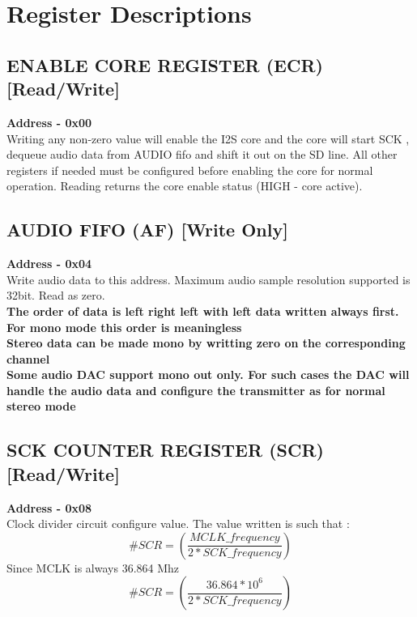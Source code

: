 \documentclass[12pt,a4paper]{report}
\begin{document}
\section{Register Descriptions}

\subsection{ENABLE CORE REGISTER (ECR)  [Read/Write] }
\hspace{1.6cm}
\textbf{Address - 0x00}
\\
\hspace{1.6cm}
Writing any non-zero value will enable the I2S core and the core will start SCK , dequeue audio data from AUDIO fifo and shift it out on the SD line.
All other registers if needed  must be configured before enabling the core for normal operation. Reading returns the core enable status (HIGH - core active).

\subsection{AUDIO FIFO (AF) [Write Only] }
\hspace{1.6cm}
\textbf{Address - 0x04}
\\
\hspace{1.6cm}
Write audio data to this address. Maximum audio sample resolution supported is 32bit. Read as zero.
\\
\textbf{The order of data is left right left with left data written always first. }
\\
\textbf{For mono mode this order is meaningless}
\\
\textbf{Stereo data can be made mono by writting zero on the corresponding channel}
\\
\textbf{Some audio DAC support mono out only. For such cases the DAC will handle the audio data and configure the transmitter as for normal stereo mode}



\subsection{SCK COUNTER REGISTER (SCR)  [Read/Write] }
\hspace{1.6cm}
\textbf{Address - 0x08}
\\
\hspace{1.6cm}
Clock divider circuit configure value. The value written is such that :
\\
 \[\textbf{\# }  SCR = (\dfrac{MCLK\_frequency}{2*SCK\_frequency} )\]
Since MCLK is always 36.864 Mhz
 \[\textbf{\# }  SCR = (\dfrac{36.864 * 10^{6}}{2*SCK\_frequency} )\]
\end{document}
